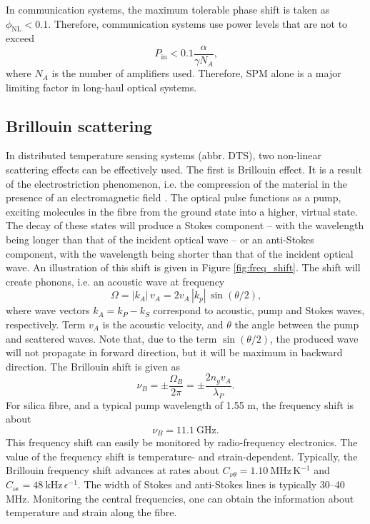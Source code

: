 \documentclass{standalone}
\begin{document}
In communication systems, the maximum tolerable phase shift is taken as $\phi_\textrm{NL} < 0.1$. Therefore, communication systems use power levels that are not to exceed
\begin{equation}
P_\textrm{in} < 0.1 \frac{\alpha}{\gamma N_A} \textrm{,}
\end{equation}
where $N_A$ is the number of amplifiers used. Therefore, SPM alone is a major limiting factor in long-haul optical systems.


\subsection{Brillouin scattering}

In distributed temperature sensing systems (abbr. DTS), two non-linear scattering effects can be effectively used. The first is Brillouin effect. It is a result of the electrostriction phenomenon, i.e. the compression of the material in the presence of an electromagnetic field \cite{agrawalNonlinear}. The optical pulse functions as a pump, exciting molecules in the fibre from the ground state into a higher, virtual state. The decay of these states will produce a Stokes component -- with the wavelength being longer than that of the incident optical wave -- or an anti-Stokes component, with the wavelength being shorter than that of the incident optical wave. An illustration of this shift is given in Figure \ref{fig:freq_shift}. 
The shift will create phonons, i.e. an acoustic wave at frequency
\begin{equation}
\Omega = \left|k_A\right| \, v_A = 2 v_A \, \left|k_p\right| \, \sin\left(\theta / 2 \right) \textrm{,}
\end{equation}
where wave vectors $k_A = k_P - k_S$ correspond to acoustic, pump and Stokes waves, respectively. Term $v_A$ is the acoustic velocity, and $\theta$ the angle between the pump and scattered waves. Note that, due to the term $\sin\left(\theta / 2\right)$, the produced wave will not propagate in forward direction, but it will be maximum in backward direction. The Brillouin shift is given as
\begin{equation}
\nu_B = \pm \frac{\Omega_B}{2 \pi} = \pm \frac{2 n_g v_A}{\lambda_P} \textrm{.}
\end{equation}
For silica fibre, and a typical pump wavelength of 1.55 \textmu m, the frequency shift is about 
\begin{equation}
\nu_B = \SI{11.1}{\giga \hertz} \textrm{.}
\end{equation}
This frequency shift can easily be monitored by radio-frequency electronics. The value of the frequency shift is temperature- and strain-dependent. Typically, the Brillouin frequency shift advances at rates about $C_{\nu\theta} = \SI{1.10}{\mega \hertz \, \kelvin^{-1}}$ and $C_{\nu\epsilon} = \SI{48}{\kilo \hertz \, \epsilon^{-1}}$. The width of Stokes and anti-Stokes lines is typically 30--40 MHz. Monitoring the central frequencies, one can obtain the information about temperature and strain along the fibre. \\
\end{document}
